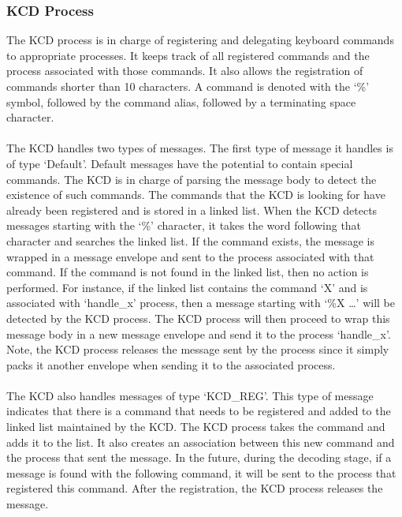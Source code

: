 \documentclass[12pt]{article}
\begin{document}
\subsubsection{KCD Process}
The KCD process is in charge of registering and delegating keyboard commands to appropriate processes. It keeps track of all registered commands and the process associated with those commands. It also allows the registration of commands shorter than 10 characters. A command is denoted with the ‘\%’ symbol, followed by the command alias, followed by a terminating space character. \\ \\
The KCD handles two types of messages. The first type of message it handles is of type ‘Default’. Default messages have the potential to contain special commands. The KCD is in charge of parsing the message body to detect the existence of such commands. The commands that the KCD is looking for have already been registered and is stored in a linked list. When the KCD detects messages starting with the ‘\%’ character, it takes the word following that character and searches the linked list. If the command exists, the message is wrapped in a message envelope and sent to the process associated with that command. If the command is not found in the linked list, then no action is performed. For instance, if the linked list contains the command ‘X’ and is associated with ‘handle\_x’ process, then a message starting with ‘\%X …’ will be detected by the KCD process. The KCD process will then proceed to wrap this message body in a new message envelope and send it to the process ‘handle\_x’. Note, the KCD process releases the message sent by the process since it simply packs it another envelope when sending it to the associated process.\\ \\
The KCD also handles messages of type ‘KCD\_REG’. This type of message indicates that there is a command that needs to be registered and added to the linked list maintained by the KCD. The KCD process takes the command and adds it to the list. It also creates an association between this new command and the process that sent the message. In the future, during the decoding stage, if a message is found with the following command, it will be sent to the process that registered this command. After the registration, the KCD process releases the message.
\end{document}
